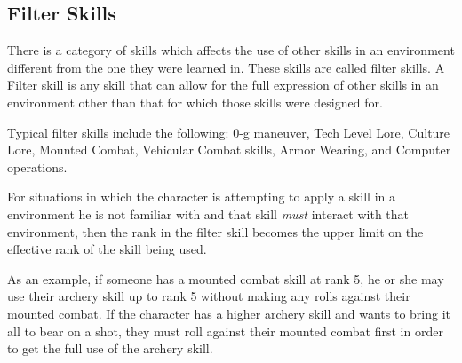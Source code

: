 \subsection{Filter Skills}

There is a category of skills which affects the use of other skills 
in an environment different from the one they were learned in. These skills 
are called filter skills. A Filter skill is any skill that can allow 
for the full expression of other skills in an environment other than 
that for which those skills were designed for.

Typical filter skills include the following: 0-g maneuver, Tech 
Level Lore, Culture Lore, Mounted Combat, Vehicular Combat 
skills, Armor Wearing, and Computer operations.

For situations in which the character is attempting to apply a skill 
in a environment he is not familiar with and that skill {\em must }
interact with that environment, then the rank in the filter skill 
becomes the upper limit on the effective rank of the skill being 
used.

As an example, if someone has a mounted combat skill at rank 5, he or she
may use their archery skill up to rank 5 without making any rolls
against their mounted combat. If the character has a higher archery skill
and wants to bring it all to bear on a shot, they must roll against
their mounted combat first in order to get the full use of the archery
skill.

